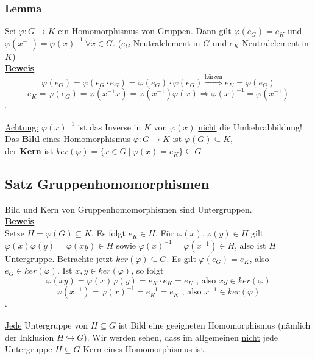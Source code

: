 \documentclass[a4paper, pagesize=pdftex, pdftex, twoside, headsepline, index=totoc,toc=listof, fontsize=10pt, cleardoublepage=empty, headinclude, DIV=13, BCOR=13mm]{scrartcl}
\newcommand{\bet}[1]{\uline{\textbf{#1}}} %
\newcommand{\Index}[1]{\uline{\textbf{#1}}\index{#1}} %
\begin{document}
\subsubsection*{Lemma}
Sei $\varphi:G \to K$ ein Homomorphismus von Gruppen. Dann gilt $\varphi(e_G)=e_K$ und $\varphi(x^{-1})=\varphi(x)^{-1}~\forall x \in G$. ($e_G$ Neutralelement in $G$ und $e_K$ Neutralelement in $K$)\\
\bet{Beweis}\\
\[
	\varphi(e_G)=\varphi(e_G \cdot e_G)=\varphi(e_G) \cdot \varphi(e_G)
	\stackrel{\text{kürzen}}{\Rightarrow} e_K=\varphi(e_G)
\]
\[
	e_K=\varphi(e_G)=\varphi(x^{-1}x)=\varphi(x^{-1})\varphi(x) \Rightarrow \varphi(x)^{-1}=\varphi(x^{-1})
\]
\hfill $\square$

\uline{Achtung:} $\varphi(x)^{-1}$ ist das Inverse in $K$ von $\varphi(x)$ \uline{nicht} die Umkehrabbildung!\\

Das \Index{Bild} eines Homomorphismus $\varphi:G \to K$ ist $\varphi(G)\subseteq K$,\\
der \Index{Kern} ist $ker(\varphi)=\{x \in G~|~\varphi(x)=e_K \}\subseteq G$

\subsection{Satz Gruppenhomomorphismen}
\label{sub:satz_ghm}
Bild und Kern von Gruppenhomomorphismen sind Untergruppen.\\

\bet{Beweis}\\
Setze $H=\varphi(G)\subseteq K$. Es folgt $e_K \in H$. Für $\varphi(x),\varphi(y)\in H$ gilt $\varphi(x)\varphi(y)=\varphi(xy)\in H$ sowie $\varphi(x)^{-1}=\varphi(x^{-1}) \in H$, also ist $H$ Untergruppe. Betrachte jetzt $ker(\varphi)\subseteq G$. Es gilt $\varphi(e_G)=e_K$, also $e_G \in ker(\varphi)$. Ist $x,y \in ker(\varphi)$, so folgt 
\[\varphi(xy)=\varphi(x)\varphi(y)=e_K \cdot e_K=e_K \text{ , also } xy \in ker(\varphi)\]
\[\varphi(x^{-1})=\varphi(x)^{-1}=e_K^{-1}=e_K \text{ , also } x^{-1} \in ker(\varphi) \]
\hfill $\square$

\uline{Jede} Untergruppe von $H\subseteq G$ ist Bild eine geeigneten Homomorphismus (nämlich der Inklusion $H \hookrightarrow G$). Wir werden sehen, dass im allgemeinen \uline{nicht} jede Untergruppe $H\subseteq G$ Kern eines Homomorphismus ist.
\end{document}
